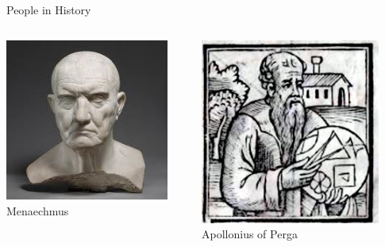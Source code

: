 \documentclass[14pt,aspectratio=169]{beamer}
\begin{document}
\begin{frame}{People in History}
 \begin{columns}
  \centering
    \includegraphics[width=0.9\textwidth]{image07.jpeg}\\ Menaechmus

  \centering
    \includegraphics[width=0.9\textwidth]{image08.jpg}\\ Apollonius of Perga

 \end{columns}

\end{frame}
\end{document}
